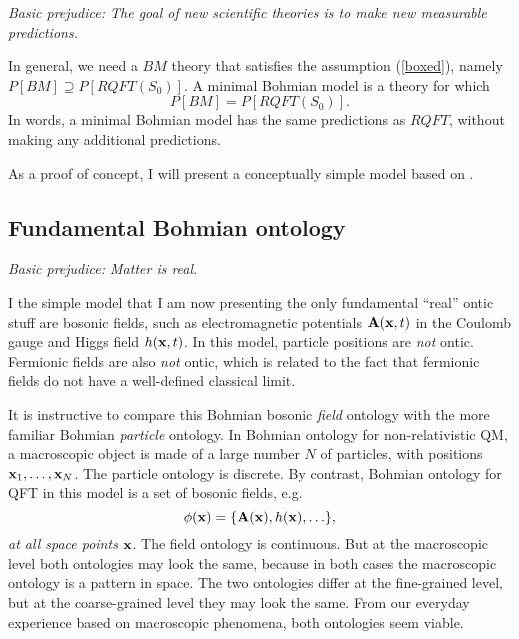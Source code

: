 \documentclass[12pt]{article}
\begin{document}
\begin{flushright}
{\it Basic prejudice: The goal of new scientific theories is to make new measurable predictions.} 
\end{flushright}

In general, we need a $BM$ theory that satisfies the assumption (\ref{boxed}), namely
$P[BM] \supseteq P[RQFT(S_0)]$.
A minimal Bohmian model is a theory for which 
\begin{equation}
P[BM] = P[RQFT(S_0)] .
\end{equation}
In words, a minimal Bohmian model has the same predictions as $RQFT$, 
without making any additional predictions.

As a proof of concept, I will present a conceptually simple model based on \cite{struyve-westman}.

\subsection{Fundamental Bohmian ontology} 

\begin{flushright}
{\it Basic prejudice: Matter is real.} 
\end{flushright}

I the simple model that I am now presenting the only fundamental ``real'' ontic stuff are bosonic fields, 
such as electromagnetic potentials ${\bf A}({\bf x},t)$ in the Coulomb gauge and 
Higgs field $h({\bf x},t)$. 
In this model, particle positions are {\em not} ontic. Fermionic fields are also {\em not} ontic,
which is related to the fact that fermionic fields do not have a well-defined classical limit.

It is instructive to compare this Bohmian bosonic {\em field} ontology with the more familiar
Bohmian {\em particle} ontology.
In Bohmian ontology for non-relativistic QM, a macroscopic object is made of a large number $N$ of 
particles, with positions ${\bf x}_1,\ldots ,{\bf x}_N$. 
The particle ontology is discrete.
By contrast, Bohmian ontology for QFT in this model is a set of bosonic fields, e.g. 
\begin{equation}
\phi({\bf x})=\{ {\bf A}({\bf x}), h({\bf x}), \ldots \} ,
\end{equation}
{\em at all space points} ${\bf x}$. 
The field ontology is continuous.
But at the macroscopic level both ontologies may look the same, because in both cases 
the macroscopic ontology is a pattern in space. The two ontologies differ at the fine-grained level,
but at the coarse-grained level they may look the same. From our everyday experience based on macroscopic 
phenomena, both ontologies seem viable. 
\end{document}
